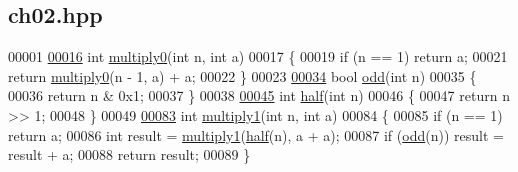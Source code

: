 \hypertarget{ch02_8hpp_source}{}\subsection{ch02.\+hpp}

\begin{DoxyCode}
00001 
\hypertarget{ch02_8hpp_source.tex_l00016}{}\hyperlink{ch02_8hpp_a7884c00903a67beac160ef1dbac5aadb}{00016} \textcolor{keywordtype}{int} \hyperlink{ch02_8hpp_a7884c00903a67beac160ef1dbac5aadb}{multiply0}(\textcolor{keywordtype}{int} n, \textcolor{keywordtype}{int} a)
00017 \{
00019   \textcolor{keywordflow}{if} (n == 1) \textcolor{keywordflow}{return} a;
00021   \textcolor{keywordflow}{return} \hyperlink{ch02_8hpp_a7884c00903a67beac160ef1dbac5aadb}{multiply0}(n - 1, a) + a;
00022 \}
00023 
\hypertarget{ch02_8hpp_source.tex_l00034}{}\hyperlink{ch02_8hpp_a332ce27d3420d4e8434d6bfc7a7795cd}{00034} \textcolor{keywordtype}{bool} \hyperlink{ch02_8hpp_a332ce27d3420d4e8434d6bfc7a7795cd}{odd}(\textcolor{keywordtype}{int} n)
00035 \{
00036   \textcolor{keywordflow}{return} n & 0x1;
00037 \}
00038 
\hypertarget{ch02_8hpp_source.tex_l00045}{}\hyperlink{ch02_8hpp_a11862a5d46925d507a569ca5a5883168}{00045} \textcolor{keywordtype}{int} \hyperlink{ch02_8hpp_a11862a5d46925d507a569ca5a5883168}{half}(\textcolor{keywordtype}{int} n)
00046 \{
00047   \textcolor{keywordflow}{return} n >> 1;
00048 \}
00049 
\hypertarget{ch02_8hpp_source.tex_l00083}{}\hyperlink{ch02_8hpp_a48a38063c9bdb0bf915285f28e412a7f}{00083} \textcolor{keywordtype}{int} \hyperlink{ch02_8hpp_a48a38063c9bdb0bf915285f28e412a7f}{multiply1}(\textcolor{keywordtype}{int} n, \textcolor{keywordtype}{int} a)
00084 \{
00085   \textcolor{keywordflow}{if} (n == 1) \textcolor{keywordflow}{return} a;
00086   \textcolor{keywordtype}{int} result = \hyperlink{ch02_8hpp_a48a38063c9bdb0bf915285f28e412a7f}{multiply1}(\hyperlink{ch02_8hpp_a11862a5d46925d507a569ca5a5883168}{half}(n), a + a);
00087   \textcolor{keywordflow}{if} (\hyperlink{ch02_8hpp_a332ce27d3420d4e8434d6bfc7a7795cd}{odd}(n)) result = result + a;
00088   \textcolor{keywordflow}{return} result;
00089 \}
\end{DoxyCode}

